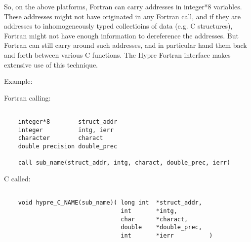 So, on the above platforms, Fortran can carry addresses in integer*8
variables.  These addresses might not have originated in any Fortran call,
and if they are addresses to inhomogeneously typed collectioins of data
(e.g. C structures), Fortran might not have enough information to dereference
the addresses.  But Fortran can still carry around such addresses, and in
particular hand them back and forth between various C functions.  The Hypre
Fortran interface makes extensive use of this technique.

Example:

  Fortran calling:

\begin{verbatim}

    integer*8        struct_addr
    integer          intg, ierr
    character        charact
    double precision double_prec

    call sub_name(struct_addr, intg, charact, double_prec, ierr)

\end{verbatim}


  C called:
  
\begin{verbatim}

    void hypre_C_NAME(sub_name)( long int  *struct_addr,
                                 int       *intg,
                                 char      *charact,
                                 double    *double_prec,
                                 int       *ierr          )
\end{verbatim}
